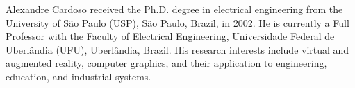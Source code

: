 \documentclass{ieeeaccess}
\begin{document}
\begin{IEEEbiographynophoto}{Alexandre Cardoso}
received the Ph.D. degree in electrical engineering from the University of
S\~ao Paulo (USP), S\~ao Paulo, Brazil, in 2002. He is currently a Full
Professor with the Faculty of Electrical Engineering, Universidade Federal de
Uberl\^andia (UFU), Uberl\^andia, Brazil. His research interests include virtual and augmented
reality, computer graphics, and their application to engineering, education, and
industrial systems.
\end{IEEEbiographynophoto}

\EOD
\end{document}
